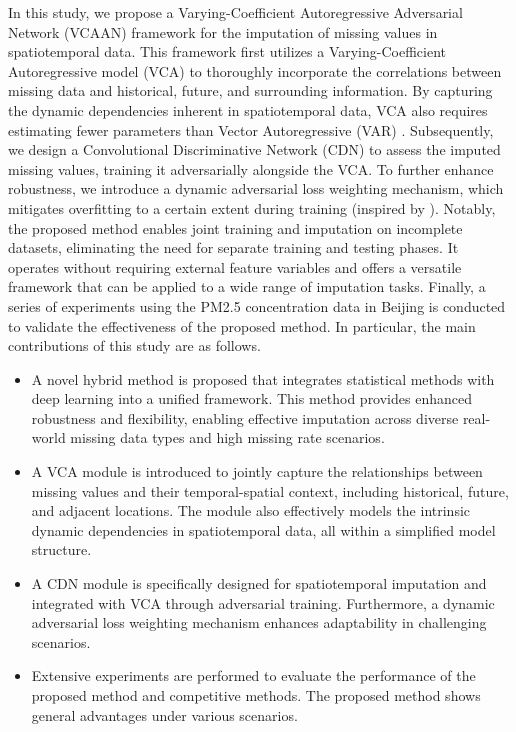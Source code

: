 \documentclass[3p,11pt,authoryear]{elsarticle}
\begin{document}
In this study, we propose a Varying-Coefficient Autoregressive Adversarial Network (VCAAN) framework for the imputation of missing values in spatiotemporal data. 
This framework first utilizes a Varying-Coefficient Autoregressive model (VCA) to thoroughly incorporate the correlations between missing data and historical, future, and surrounding information. By capturing the dynamic dependencies inherent in spatiotemporal data, VCA also requires estimating fewer parameters than Vector Autoregressive (VAR) \citep{sims1980macroeconomics}.
Subsequently, we design a Convolutional Discriminative Network (CDN) to assess the imputed missing values, training it adversarially alongside the VCA. To further enhance robustness, we introduce a dynamic adversarial loss weighting mechanism, which mitigates overfitting to a certain extent during training (inspired by \citep{du2023saits, huang2024sdnet}). Notably, the proposed method enables joint training and imputation on incomplete datasets, eliminating the need for separate training and testing phases. It operates without requiring external feature variables and offers a versatile framework that can be applied to a wide range of imputation tasks. Finally, a series of experiments using the PM2.5 concentration data in Beijing is conducted to validate the effectiveness of the proposed method. 
In particular, the main contributions of this study are as follows. 
\begin{itemize}
	\item [1)] A novel hybrid method is proposed that integrates statistical methods with deep learning into a unified framework. This method provides enhanced robustness and flexibility, enabling effective imputation across diverse real-world missing data types and high missing rate scenarios. 
	\item [2)] A VCA module is introduced to jointly capture the relationships between missing values and their temporal-spatial context, including historical, future, and adjacent locations. The module also effectively models the intrinsic dynamic dependencies in spatiotemporal data, all within a simplified model structure. 
	\item [3)] A CDN module is specifically designed for spatiotemporal imputation and integrated with VCA through adversarial training. Furthermore, a dynamic adversarial loss weighting mechanism enhances adaptability in challenging scenarios. 
	\item [4)] Extensive experiments are performed to evaluate the performance of the proposed method and competitive methods. The proposed method shows general advantages under various scenarios. 
\end{itemize}
\end{document}
